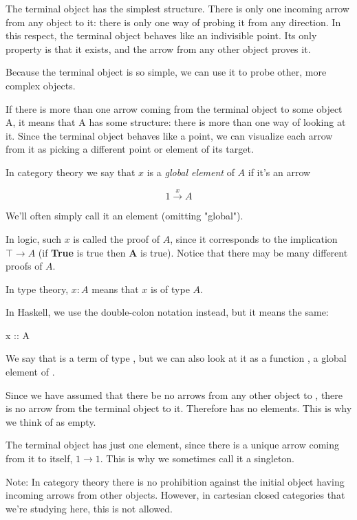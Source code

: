 \documentclass[DaoFP]{subfiles}
\begin{document}
The terminal object has the simplest structure. There is only one incoming arrow from any object to it: there is only one way of probing it from any direction. In this respect, the terminal object behaves like an indivisible point. Its only property is that it exists, and the arrow from any other object proves it. 

Because the terminal object is so simple, we can use it to probe other, more complex objects. 

If there is more than one arrow coming from the terminal object to some object A, it means that A has some structure: there is more than one way of looking at it. Since the terminal object behaves like a point, we can visualize each arrow from it as picking a different point or element of its target. 

In category theory we say that $ x$ is a \emph{global element} of $ A$ if it's an arrow

\[ 1 \xrightarrow x A \]

We'll often simply call it an element (omitting "global").

In logic, such $ x$ is called the proof of $ A$, since it corresponds to the implication $ \top \to A$ (if \textbf{True} is true then \textbf{A} is true). Notice that there may be many different proofs of $A$.

In type theory, $ x \colon A$ means that $ x$ is of type $ A$.

In Haskell, we use the double-colon notation instead, but it means the same:

\begin{haskell}
x :: A
\end{haskell}
We say that  is a term of type , but we can also look at it as a function , a global element of . 

Since we have assumed that there be no arrows from any other object to , there is no arrow from the terminal object to it. Therefore  has no elements. This is why we think of  as empty.

The terminal object has just one element, since there is a unique arrow coming from it to itself, $ 1 \to 1$. This is why we sometimes call it a singleton. 

Note: In category theory there is no prohibition against the initial object having incoming arrows from other objects. However, in cartesian closed categories that we're studying here, this is not allowed.
\end{document}
